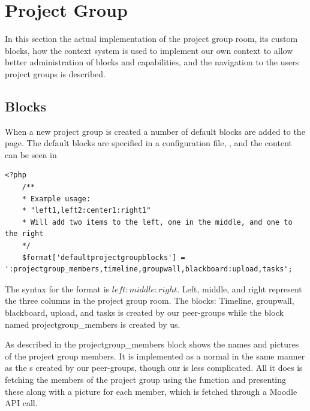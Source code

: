 \section{Project Group \viewroom[c]}
\label{sec:projGroupRoomImpl}
In this section the actual implementation of the project group room, its custom blocks, how the context system is used to implement our own context to allow better administration of blocks and capabilities, and the navigation to the users project groups is described. %





\subsection{Blocks}
\label{sec:implprojectgroupblocks}
When a new project group is created a number of default blocks are added to the page. 
The default blocks are specified in a configuration file, , and the content can be seen in 


\begin{lstlisting}[style=phpCode, caption=\myCaption{The default block configuration}, label=moodledaultblock]
<?php
	/**
	* Example usage:
	* "left1,left2:center1:right1"
	* Will add two items to the left, one in the middle, and one to the right
	*/
	$format['defaultprojectgroupblocks'] = ':projectgroup_members,timeline,groupwall,blackboard:upload,tasks';
\end{lstlisting}
The syntax for the format is $left:middle:right$. 
Left, middle, and right represent the three columns in the project group room. 
The blocks: Timeline, groupwall, blackboard, upload, and tasks is created by our peer-groups while the block named projectgroup\_members is created by us. 

As described in  the projectgroup\_members block shows the names and pictures of the project group members. 
It is implemented as a normal \block{} in the same manner as the \block{}s created by our peer-groups, though our \block{} is less complicated. 
All it does is fetching the members of the project group using the function  and presenting these along with a picture for each member, which is fetched through a Moodle API call. 

